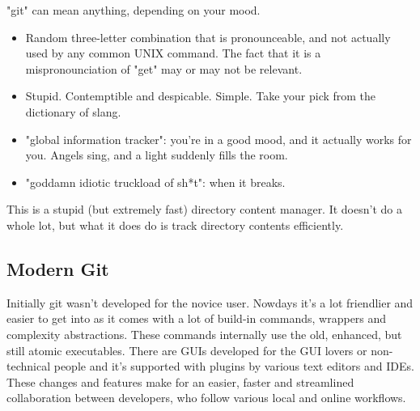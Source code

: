 \documentclass[12pt,a4]{article}
\begin{document}
"git" can mean anything, depending on your mood.
\begin{itemize}
\vspace*{-10pt}
\item Random three-letter combination that is pronounceable, and not actually
	used by any common UNIX command. The fact that it is a mispronounciation of
	"get" may or may not be relevant.
\vspace*{-3pt}
\item Stupid. Contemptible and despicable. Simple. Take your pick from the
	dictionary of slang.
\vspace*{-3pt}
\item "global information tracker": you're in a good mood, and it actually
   works for you. Angels sing, and a light suddenly fills the room.
\vspace*{-3pt}
\item "goddamn idiotic truckload of sh*t": when it breaks.
\vspace*{-10pt}
\end{itemize}

This is a stupid (but extremely fast) directory content manager. It doesn't do
a whole lot, but what it does do is track directory contents efficiently.

\subsection{Modern Git}
Initially git wasn't developed for the novice user. Nowdays it's a lot
friendlier and easier to get into as it comes with a lot of build-in commands,
wrappers and complexity abstractions. These commands internally use the old,
enhanced, but still atomic executables. There are GUIs developed for the GUI
lovers or non-technical people and it's supported with plugins by various text
editors and IDEs. These changes and features make for an easier, faster and
streamlined collaboration between developers, who follow various local and
online workflows.
\end{document}
